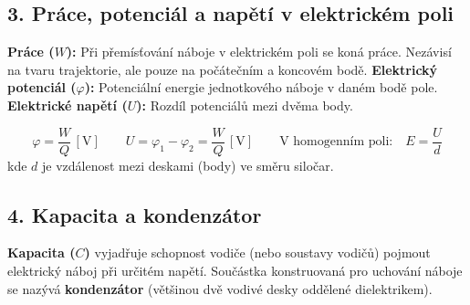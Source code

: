 \documentclass[a4paper,10pt]{article}
\newcommand{\jednotka}[1]{\,[\mathrm{#1}]}
\begin{document}
\begin{vysvetlenibox}
\begin{center}
\end{center}

\subsection*{3. Práce, potenciál a napětí v elektrickém poli}

\textbf{Práce ($W$):} Při přemísťování náboje v elektrickém poli se koná práce. Nezávisí na tvaru trajektorie, ale pouze na počátečním a koncovém bodě.
\textbf{Elektrický potenciál ($\varphi$):} Potenciální energie jednotkového náboje v daném bodě pole.
\textbf{Elektrické napětí ($U$):} Rozdíl potenciálů mezi dvěma body.

\begin{vzorcebox}
\[
\varphi = \frac{W}{Q} \jednotka{V}
\qquad
U = \varphi_1 - \varphi_2 = \frac{W}{Q} \jednotka{V}
\qquad
\text{V homogenním poli:} \quad E = \frac{U}{d}
\]
kde $d$ je vzdálenost mezi deskami (body) ve směru siločar.
\end{vzorcebox}

\subsection*{4. Kapacita a kondenzátor}

\textbf{Kapacita ($C$)} vyjadřuje schopnost vodiče (nebo soustavy vodičů) pojmout elektrický náboj při určitém napětí. Součástka konstruovaná pro uchování náboje se nazývá \textbf{kondenzátor} (většinou dvě vodivé desky oddělené dielektrikem).


\end{vysvetlenibox}
\end{document}
